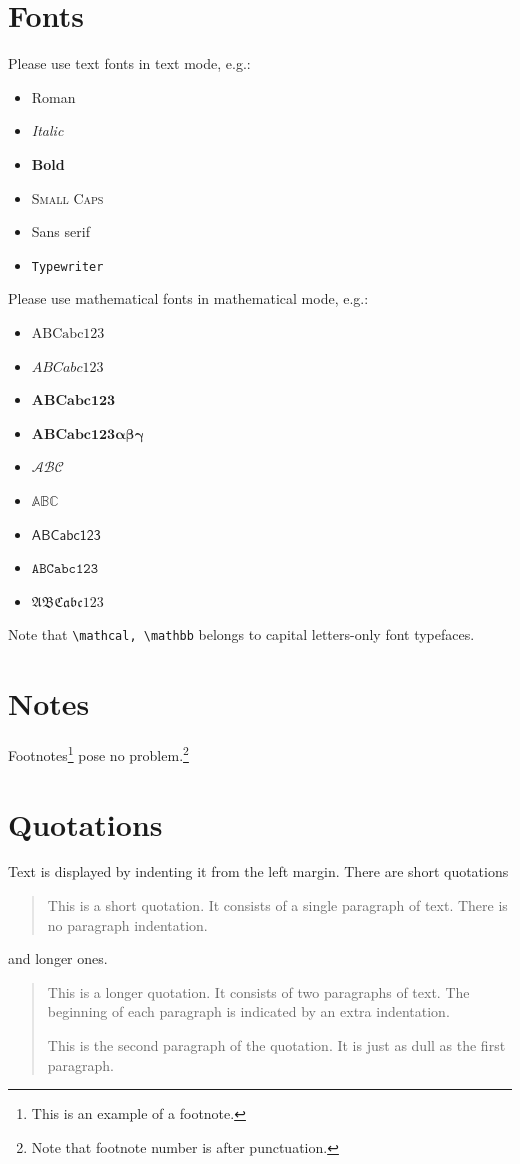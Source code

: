 \documentclass[ps]{imsart}
\theoremstyle{plain}
\theoremstyle{definition}
\theoremstyle{remark}
\begin{document}
\section{Fonts}
Please use text fonts in text mode, e.g.:
\begin{itemize}
\item[]\textrm{Roman}
\item[]\textit{Italic}
\item[]\textbf{Bold}
\item[]\textsc{Small Caps}
\item[]\textsf{Sans serif}
\item[]\texttt{Typewriter}
\end{itemize}
Please use mathematical fonts in mathematical mode, e.g.:
\begin{itemize}
\item[] $\mathrm{ABCabc123}$
\item[] $\mathit{ABCabc123}$
\item[] $\mathbf{ABCabc123}$
\item[] $\boldsymbol{ABCabc123\alpha\beta\gamma}$
\item[] $\mathcal{ABC}$
\item[] $\mathbb{ABC}$
\item[] $\mathsf{ABCabc123}$
\item[] $\mathtt{ABCabc123}$
\item[] $\mathfrak{ABCabc123}$
\end{itemize}
Note that \verb|\mathcal, \mathbb| belongs to capital letters-only font typefaces.

\section{Notes}
Footnotes\footnote{This is an example of a footnote.}
pose no problem.\footnote{Note that footnote number is after punctuation.}

\section{Quotations}

Text is displayed by indenting it from the left margin. There are short quotations
\begin{quote}
This is a short quotation.  It consists of a
single paragraph of text.  There is no paragraph
indentation.
\end{quote}
and longer ones.
\begin{quotation}
This is a longer quotation.  It consists of two paragraphs
of text.  The beginning of each paragraph is indicated
by an extra indentation.

This is the second paragraph of the quotation.  It is just
as dull as the first paragraph.
\end{quotation}
\end{document}
